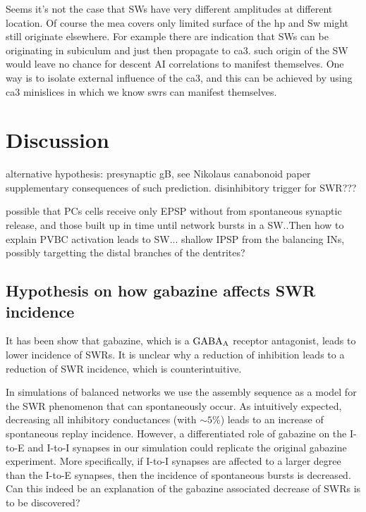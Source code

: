     Seems it's not the case that SWs have very different amplitudes at
    different location. Of course the mea covers only limited surface of the hp
    and Sw might still originate elsewhere. For example there are indication
    that SWs can be originating in subiculum and just then propagate to ca3.
    such origin of the SW would leave no chance for descent AI correlations to
    manifest themselves. One way is to isolate external influence of the ca3,
    and this can be achieved by using ca3 minislices in which we know swrs can
    manifest themselves.


\section{Discussion}
  alternative hypothesis: presynaptic gB, see Nikolaus canabonoid paper supplementary
  consequences of such prediction. 
  disinhibitory trigger for SWR???

  possible that PCs cells receive only EPSP without from spontaneous synaptic
  release, and those built up in time until network bursts in a SW..Then how to
  explain PVBC activation leads to SW... shallow IPSP from the balancing INs,
  possibly targetting the distal branches of the dentrites?

  \subsection{Hypothesis on how gabazine affects SWR incidence} 

    It has been show that gabazine, which is a ${\rm GABA_A}$ receptor
    antagonist, leads to lower incidence of SWRs. It is unclear why a reduction
    of inhibition leads to a reduction of SWR incidence, which is
    counterintuitive.

    In simulations of balanced networks we use the assembly sequence as a model
    for the SWR phenomenon that can spontaneously occur. As intuitively
    expected, decreasing all inhibitory conductances (with $\sim 5 \%$) leads
    to an increase of spontaneous replay incidence. However, a differentiated
    role of gabazine on the I-to-E and I-to-I synapses in our simulation could
    replicate the original gabazine experiment. More specifically, if I-to-I
    synapses are affected to a larger degree than the I-to-E synapses, then the
    incidence of spontaneous bursts is decreased. Can this indeed be an
    explanation of the gabazine associated decrease of SWRs is to be
    discovered?


